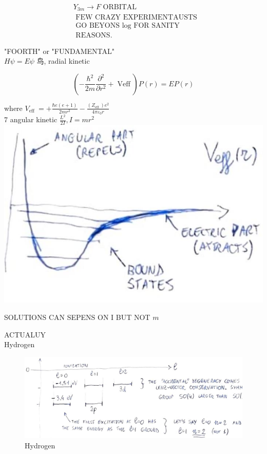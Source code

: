 \documentclass[10pt]{article}
\begin{document}
$$
\begin{aligned}
& Y_{3 m} \rightarrow F \text { ORBITAL } \\
& \text { FEW CRAZY EXPERIMENTAUSTS } \\
& \text { GO BEYONS } \log \text { FOR SANITY } \\
& \text { REASONS. }
\end{aligned}
$$

"FOORTH" or "FUNDAMENTAL"\\
$H \psi=E \psi$ 鸟, radial kinetic

$$
\left(-\frac{\hbar^{2}}{2 m} \frac{\partial^{2}}{\partial r^{2}}+\operatorname{Veff}\right) P(r)=E P(r)
$$

where $V_{\text {eff }}=+\frac{\hbar e(e+1)}{2 m r^{2}}-\frac{\left(Z_{\text {eff }}\right) e^{2}}{4 \pi \varepsilon_{0} r}$\\
7 angular kinetic $\frac{L^{2}}{2 I}, I=m r^{2}$\\
\includegraphics[max width=\textwidth, center]{2025_10_16_22329e0f50bdd2511b17g-11(1)}

SOLUTIONS CAN SEPENS ON I BUT NOT $m$

ACTUALUY\\
Hydrogen

\begin{figure}[h]
\begin{center}
\captionsetup{labelformat=empty}
\caption{Hydrogen}
  \includegraphics[width=\textwidth]{2025_10_16_22329e0f50bdd2511b17g-11(2)}
\end{center}
\end{figure}
\end{document}
